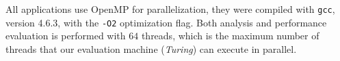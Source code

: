 %

%





All applications use OpenMP for parallelization, they  were compiled with
\texttt{gcc}, version 4.6.3, with the \texttt{-O2} optimization flag.  Both
analysis and performance evaluation is performed with $64$ threads,
which is the maximum number of threads that our evaluation machine
(\emph{Turing}) can execute in parallel.

